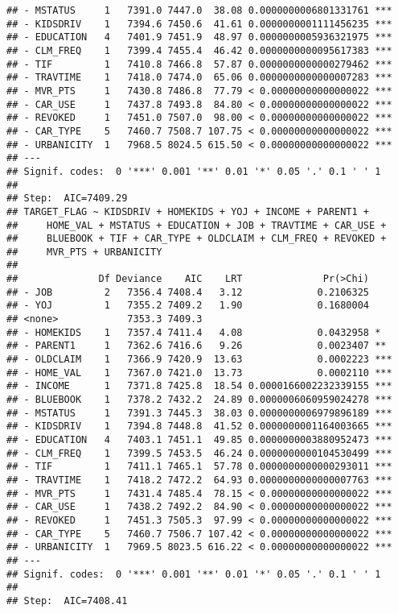 \documentclass[
]{article}
\begin{document}
\begin{verbatim}
## - MSTATUS     1   7391.0 7447.0  38.08 0.0000000006801331761 ***
## - KIDSDRIV    1   7394.6 7450.6  41.61 0.0000000001111456235 ***
## - EDUCATION   4   7401.9 7451.9  48.97 0.0000000005936321975 ***
## - CLM_FREQ    1   7399.4 7455.4  46.42 0.0000000000095617383 ***
## - TIF         1   7410.8 7466.8  57.87 0.0000000000000279462 ***
## - TRAVTIME    1   7418.0 7474.0  65.06 0.0000000000000007283 ***
## - MVR_PTS     1   7430.8 7486.8  77.79 < 0.00000000000000022 ***
## - CAR_USE     1   7437.8 7493.8  84.80 < 0.00000000000000022 ***
## - REVOKED     1   7451.0 7507.0  98.00 < 0.00000000000000022 ***
## - CAR_TYPE    5   7460.7 7508.7 107.75 < 0.00000000000000022 ***
## - URBANICITY  1   7968.5 8024.5 615.50 < 0.00000000000000022 ***
## ---
## Signif. codes:  0 '***' 0.001 '**' 0.01 '*' 0.05 '.' 0.1 ' ' 1
## 
## Step:  AIC=7409.29
## TARGET_FLAG ~ KIDSDRIV + HOMEKIDS + YOJ + INCOME + PARENT1 + 
##     HOME_VAL + MSTATUS + EDUCATION + JOB + TRAVTIME + CAR_USE + 
##     BLUEBOOK + TIF + CAR_TYPE + OLDCLAIM + CLM_FREQ + REVOKED + 
##     MVR_PTS + URBANICITY
## 
##              Df Deviance    AIC    LRT              Pr(>Chi)    
## - JOB         2   7356.4 7408.4   3.12             0.2106325    
## - YOJ         1   7355.2 7409.2   1.90             0.1680004    
## <none>            7353.3 7409.3                                 
## - HOMEKIDS    1   7357.4 7411.4   4.08             0.0432958 *  
## - PARENT1     1   7362.6 7416.6   9.26             0.0023407 ** 
## - OLDCLAIM    1   7366.9 7420.9  13.63             0.0002223 ***
## - HOME_VAL    1   7367.0 7421.0  13.73             0.0002110 ***
## - INCOME      1   7371.8 7425.8  18.54 0.0000166002232339155 ***
## - BLUEBOOK    1   7378.2 7432.2  24.89 0.0000006060959024278 ***
## - MSTATUS     1   7391.3 7445.3  38.03 0.0000000006979896189 ***
## - KIDSDRIV    1   7394.8 7448.8  41.52 0.0000000001164003665 ***
## - EDUCATION   4   7403.1 7451.1  49.85 0.0000000003880952473 ***
## - CLM_FREQ    1   7399.5 7453.5  46.24 0.0000000000104530499 ***
## - TIF         1   7411.1 7465.1  57.78 0.0000000000000293011 ***
## - TRAVTIME    1   7418.2 7472.2  64.93 0.0000000000000007763 ***
## - MVR_PTS     1   7431.4 7485.4  78.15 < 0.00000000000000022 ***
## - CAR_USE     1   7438.2 7492.2  84.90 < 0.00000000000000022 ***
## - REVOKED     1   7451.3 7505.3  97.99 < 0.00000000000000022 ***
## - CAR_TYPE    5   7460.7 7506.7 107.42 < 0.00000000000000022 ***
## - URBANICITY  1   7969.5 8023.5 616.22 < 0.00000000000000022 ***
## ---
## Signif. codes:  0 '***' 0.001 '**' 0.01 '*' 0.05 '.' 0.1 ' ' 1
## 
## Step:  AIC=7408.41

\end{verbatim}
\end{document}
